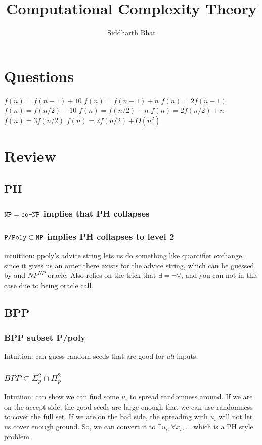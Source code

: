 \documentclass[11pt]{book}
\title{Computational Complexity Theory}
\author{Siddharth Bhat}
\date{}
\begin{document}
\maketitle
\tableofcontents














\chapter{Questions}
$f (n) = f (n − 1) + 10$
$f (n) = f (n − 1) + n$
$f (n) = 2f (n − 1)$
$f (n) = f (n/2) + 10$
$f (n) = f (n/2) + n$
$f (n) = 2f (n/2) + n$
$f (n) = 3f (n/2)$
$f (n) = 2f (n/2) + O(n^2)$


\chapter{Review}
\section{PH}
\subsection{$\texttt{NP} = \texttt{co-NP}$ implies that PH collapses}
\subsection{$\text{\texttt{P/Poly}} \subset \texttt{NP}$ implies PH collapses to level 2}
intuitiion: ppoly's advice string lets us do something like quantifier
exchange, since it gives us an outer there exists for the advice string,
which can be guessed by and $NP^{NP}$ oracle. Also relies on the trick that
$\exists = \lnot \forall$, and you can not in this case due to being oracle call.
\section{BPP}
\subsection{BPP subset P/poly}
Intuition: can guess random seeds that are good for \emph{all} inputs.
\subsection{$BPP \subset \Sigma_p^2 \cap \Pi_p^2$}
Intutiion: can show we can find some $u_i$ to spread randomness around.
If we are on the accept side, the good seeds are large enough that we
can use randomness to cover the full set. If we are on the bad side, the
spreading with $u_i$ will not let us cover enough ground. So, we can 
convert it to $\exists u_i, \forall x_i, ...$ which is a PH style problem.
\end{document}
